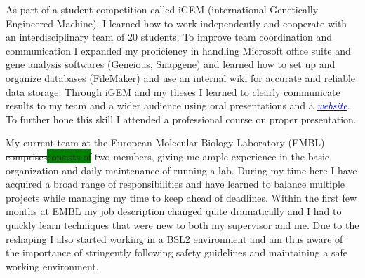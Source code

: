 \documentclass[11pt,a4paper,sans]{moderncv}
\begin{document}
\begin{spacing}{1.15}
As part of a student competition called iGEM (international Genetically Engineered Machine), I learned how to work independently and cooperate with an interdisciplinary team of 20 students. %
To improve team coordination and communication I expanded my proficiency in handling Microsoft office suite and gene analysis softwares (Geneious, Snapgene) and learned how to set up and organize databases (FileMaker) and use an internal wiki for accurate and reliable data storage. %
Through iGEM and my theses I learned to clearly communicate results to my team and a wider audience using oral presentations and a {\href{http://2015.igem.org/Team:Freiburg}{\textcolor{blue}{\textit{website}}}}. %
To further hone this skill I attended a professional course on proper presentation.\par\vspace*{1mm} %

My current team at the European Molecular Biology Laboratory (EMBL) \sout{comprises}\colorbox{green}{consists of} two members, giving me ample experience in the basic organization and daily maintenance of running a lab. %
During my time here I have acquired a broad range of responsibilities and have learned to balance multiple projects while managing my time to keep ahead of deadlines. %
Within the first few months at EMBL my job description changed quite dramatically and I had to quickly learn techniques that were new to both my supervisor and me. %
Due to the reshaping I also started working in a BSL2 environment and am thus aware of the importance of stringently following safety guidelines and maintaining a safe working environment.\par\vspace*{1mm} %


\end{spacing}
\end{document}
